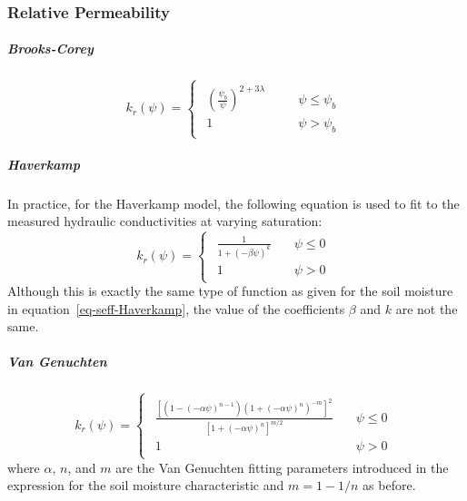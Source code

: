 \documentclass[fleqn]{article}
\begin{document}
\subsubsection{Relative Permeability}
\subparagraph{Brooks-Corey}
\begin{equation}
  k_r(\psi)  =
  \begin{cases}
    \begin{aligned}
      \left( \frac{\psi_b}{\psi} \right)^{2 + 3\lambda} & \quad & \psi \leq \psi_b \\
      1                                                 & \quad & \psi > \psi_b
    \end{aligned}
  \end{cases}
  \label{eq-kr-BrooksCorey}
\end{equation}

\subparagraph{Haverkamp}
In practice, for the Haverkamp model, the following equation is used to fit
to the measured hydraulic conductivities at varying saturation:
\begin{equation}
  k_r(\psi)  =
  \begin{cases}
    \begin{aligned}
      \frac{1}
      {
        1 + \left( -\beta\psi \right)^{k}
      } \quad & \psi \leq 0 \\
      1 \quad & \psi > 0
    \end{aligned}
  \end{cases}
  \label{eq-kr-Haverkamp}
\end{equation}
Although this is exactly the same type of function as given for the
soil moisture in equation~\ref{eq-seff-Haverkamp}, the value of the
coefficients $\beta$ and $k$ are not the same.

\subparagraph{Van Genuchten}
\begin{equation}
  k_r(\psi)  =
  \begin{cases}
    \begin{aligned}
      \frac{
        \left[
          \left( 1 - (-\alpha \psi)^{n-1} \right) 
          \left( 1 + (-\alpha \psi)^n \right)^{-m}
          \right]^2
      }
      {
        \left[ 1 + (-\alpha \psi)^n \right]^{m/2}
      }
      \quad   & \psi \leq 0 \\
      1 \quad & \psi > 0
    \end{aligned}
  \end{cases}
  \label{eq-kr-vanGenuchten}
\end{equation}
where $\alpha$, $n$, and $m$ are the Van Genuchten fitting parameters
introduced in the expression for the soil moisture characteristic
and $m = 1 - 1/n$ as before.
\end{document}
